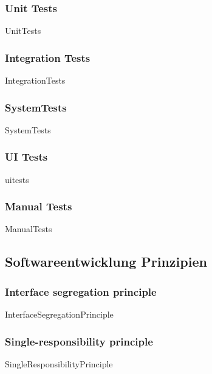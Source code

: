 \documentclass{article}
\begin{document}
        \subsubsection{Unit Tests}
            {UnitTests}
        
        \subsubsection{Integration Tests}
            {IntegrationTests}

        \subsubsection{SystemTests}
            {SystemTests}

        \subsubsection{UI Tests}
            {uitests}

        \newpage
        \subsubsection{Manual Tests}
            {ManualTests}
    \newpage
    \subsection{Softwareentwicklung Prinzipien}

        \subsubsection{Interface segregation principle}
        \label{kap:ISP}
            {InterfaceSegregationPrinciple}

        \newpage
        \subsubsection{Single-responsibility principle}
        \label{kap:SRP}
            {SingleResponsibilityPrinciple}
            
\end{document}
